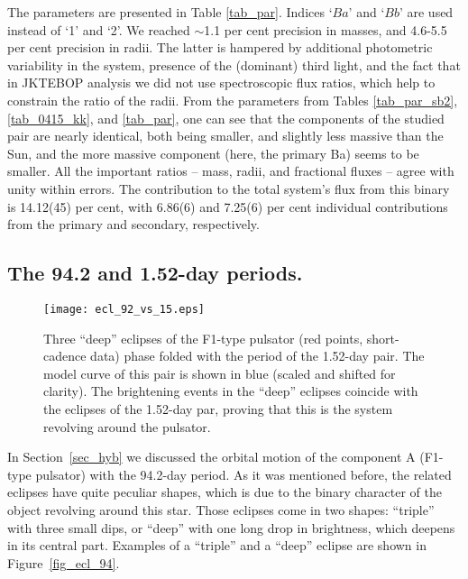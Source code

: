 \documentclass{aa}
\begin{document}
The parameters are presented in Table \ref{tab_par}. Indices `$Ba$' and `$Bb$' are
used instead of `1' and `2'. We reached 
$\sim$1.1 per cent precision in masses, and 4.6-5.5 per cent precision 
in radii. The latter is hampered by additional photometric variability in the system, 
presence of the (dominant) third light, and the fact that in JKTEBOP analysis we did 
not use spectroscopic flux ratios, which help to constrain the ratio of the radii. 
From the parameters from Tables \ref{tab_par_sb2}, \ref{tab_0415_kk}, and \ref{tab_par},
one can see that the components of the studied pair are nearly identical,
both being smaller, and slightly less massive than the Sun, and the more
massive component (here, the primary Ba) seems to be smaller. All the important
ratios -- mass, radii, and fractional fluxes -- agree with unity within errors.
The contribution to the total system's flux from this binary is 14.12(45) per cent,
with 6.86(6) and 7.25(6) per cent individual contributions from the primary and secondary,
respectively.

\subsection{The 94.2 and 1.52-day periods.}

\begin{figure}
\centering
\texttt{[image: ecl\_92\_vs\_15.eps]}
\caption{Three ``deep'' eclipses of the F1-type pulsator (red points,
short-cadence data) phase folded with the period of the
1.52-day pair. The model curve of this pair is shown in
blue (scaled and shifted for clarity). The brightening events in the ``deep''
eclipses coincide with the eclipses of the 1.52-day par, 
proving that this is the system revolving around the pulsator.}\label{fig_94_vs_15}
\end{figure}

In Section~\ref{sec_hyb} we discussed the orbital motion of the component A
(F1-type pulsator) with the 94.2-day period. As it was mentioned before,
the related eclipses have quite peculiar shapes, which is due to the binary 
character of the object revolving around this star. Those eclipses come in two
shapes: ``triple'' with three small dips, or ``deep'' with one long drop in brightness,
which deepens in its central part. Examples of a ``triple'' and a ``deep''
eclipse are shown in Figure~\ref{fig_ecl_94}. 
\end{document}
